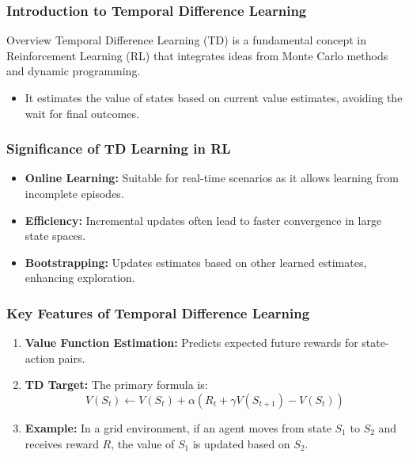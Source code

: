 \documentclass[aspectratio=169]{beamer}
\begin{document}
\frame{\titlepage}

\begin{frame}[fragile]
    \frametitle{Introduction to Temporal Difference Learning}
    \begin{block}{Overview}
        Temporal Difference Learning (TD) is a fundamental concept in Reinforcement Learning (RL) that integrates ideas from Monte Carlo methods and dynamic programming. 
    \end{block}
    \begin{itemize}
        \item It estimates the value of states based on current value estimates, avoiding the wait for final outcomes.
    \end{itemize}
\end{frame}

\begin{frame}[fragile]
    \frametitle{Significance of TD Learning in RL}
    \begin{itemize}
        \item \textbf{Online Learning:} Suitable for real-time scenarios as it allows learning from incomplete episodes.
        \item \textbf{Efficiency:} Incremental updates often lead to faster convergence in large state spaces.
        \item \textbf{Bootstrapping:} Updates estimates based on other learned estimates, enhancing exploration.
    \end{itemize}
\end{frame}

\begin{frame}[fragile]
    \frametitle{Key Features of Temporal Difference Learning}
    \begin{enumerate}
        \item \textbf{Value Function Estimation:} Predicts expected future rewards for state-action pairs.
        \item \textbf{TD Target:} The primary formula is:
        \begin{equation}
            V(S_t) \leftarrow V(S_t) + \alpha \left( R_t + \gamma V(S_{t+1}) - V(S_t) \right)
        \end{equation}
        \item \textbf{Example:} In a grid environment, if an agent moves from state \( S_1 \) to \( S_2 \) and receives reward \( R \), the value of \( S_1 \) is updated based on \( S_2 \).
    \end{enumerate}
\end{frame}
\end{document}

